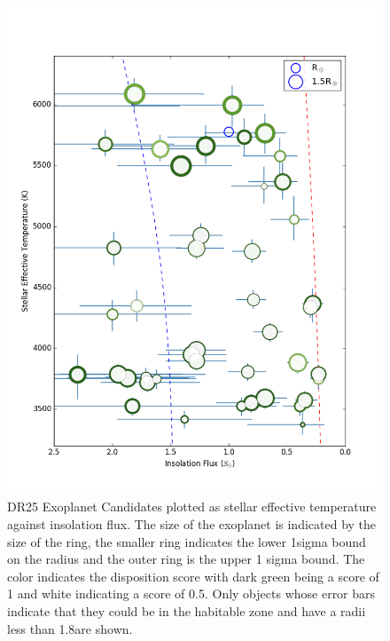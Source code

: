 \begin{figure}
    \centering
    \includegraphics[width=1.1\linewidth]{fig-hzTstarInsol.png}
    \caption{DR25 Exoplanet Candidates plotted as stellar effective temperature against insolation flux. The size of the exoplanet is indicated by the size of the ring, the smaller ring indicates the lower 1sigma bound on the radius and the outer ring is the upper 1 sigma bound.  The color indicates the disposition score with dark green being a score of 1 and white indicating a score of 0.5. Only objects whose error bars indicate that they could be in the habitable zone and have a radii less than 1.8\re are shown. }
    \label{f:hzNarrow}
\end{figure}


